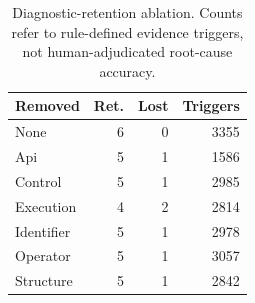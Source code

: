 \begin{table}
\caption{Diagnostic-retention ablation. Counts refer to rule-defined evidence triggers, not human-adjudicated root-cause accuracy.}
\label{tab:explainability-ablation}
\begin{tabular}{lrrr}
\toprule
Removed & Ret. & Lost & Triggers \\
\midrule
None & 6 & 0 & 3355 \\
Api & 5 & 1 & 1586 \\
Control & 5 & 1 & 2985 \\
Execution & 4 & 2 & 2814 \\
Identifier & 5 & 1 & 2978 \\
Operator & 5 & 1 & 3057 \\
Structure & 5 & 1 & 2842 \\
\bottomrule
\end{tabular}
\end{table}
